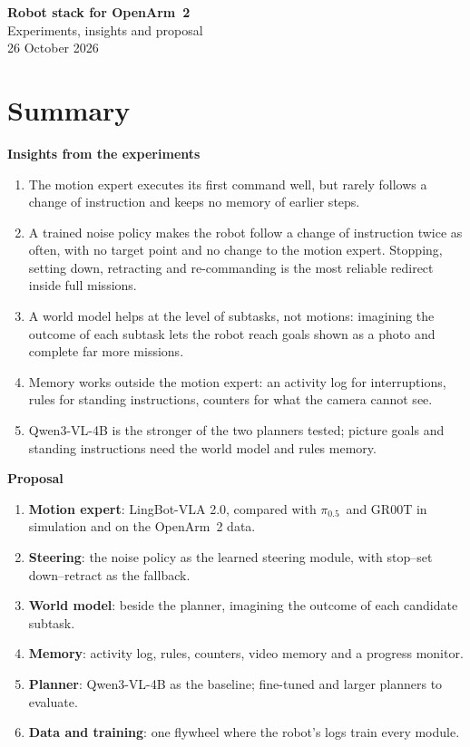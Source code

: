 \documentclass[11pt,a4paper]{article}
\newcommand{\pzf}{$\pi_{0.5}$}
\newcommand{\sub}[1]{\par\needspace{4\baselineskip}\smallskip\noindent\textbf{#1}\par}
\begin{document}
\begin{center}
{\LARGE\bfseries Robot stack for OpenArm~2}\\[4pt]
{\large Experiments, insights and proposal}\\[4pt]
{\small 26 October 2026}
\end{center}

\section*{Summary}
\sub{Insights from the experiments}
\begin{enumerate}[label=\textbf{\arabic*.}]
\item The motion expert executes its first command well, but rarely follows a change of instruction and keeps no memory of earlier steps.
\item A trained noise policy makes the robot follow a change of instruction twice as often, with no target point and no change to the motion expert. Stopping, setting down, retracting and re-commanding is the most reliable redirect inside full missions.
\item A world model helps at the level of subtasks, not motions: imagining the outcome of each subtask lets the robot reach goals shown as a photo and complete far more missions.
\item Memory works outside the motion expert: an activity log for interruptions, rules for standing instructions, counters for what the camera cannot see.
\item Qwen3-VL-4B is the stronger of the two planners tested; picture goals and standing instructions need the world model and rules memory.
\end{enumerate}

\sub{Proposal}
\begin{enumerate}[label=\textbf{\arabic*.}]
\item \textbf{Motion expert}: LingBot-VLA 2.0, compared with \pzf\ and GR00T in simulation and on the OpenArm~2 data.
\item \textbf{Steering}: the noise policy as the learned steering module, with stop--set down--retract as the fallback.
\item \textbf{World model}: beside the planner, imagining the outcome of each candidate subtask.
\item \textbf{Memory}: activity log, rules, counters, video memory and a progress monitor.
\item \textbf{Planner}: Qwen3-VL-4B as the baseline; fine-tuned and larger planners to evaluate.
\item \textbf{Data and training}: one flywheel where the robot's logs train every module.
\end{enumerate}
\end{document}
